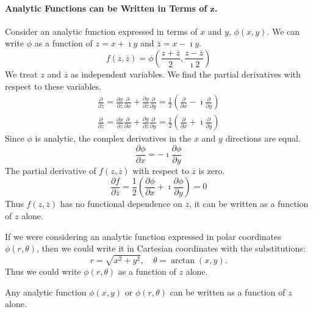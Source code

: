 \paragraph{Analytic Functions can be Written in Terms of $\mathbf{z}$.}
Consider an analytic function expressed in terms of $x$ and $y$, $\phi(x, y)$.
We can write $\phi$ as a function of $z = x + \imath y$ and $\overline{z} = x - \imath y$.
\[
f \left( z, \overline{z} \right) 
= \phi \left( \frac{z + \overline{z}}{2}, \frac{z - \overline{z}}{\imath 2} \right)
\]
We treat $z$ and $\overline{z}$ as independent variables.  We find the 
partial derivatives with respect to these variables.
\begin{gather*}
  \frac{\partial}{\partial z} = \frac{\partial x}{\partial z} \frac{\partial}{\partial x} 
  + \frac{\partial y}{\partial z} \frac{\partial }{\partial y}
  = \frac{1}{2} \left( \frac{\partial}{\partial x} - \imath \frac{\partial}{\partial y} \right) 
  \\
  \frac{\partial}{\partial \overline{z}} 
  = \frac{\partial x}{\partial \overline{z}} \frac{\partial}{\partial x} 
  + \frac{\partial y}{\partial \overline{z}} \frac{\partial}{\partial y}
  = \frac{1}{2} \left( \frac{\partial}{\partial x} + \imath \frac{\partial}{\partial y} \right)
\end{gather*}
Since $\phi$ is analytic, the complex derivatives in the $x$ and $y$ directions
are equal.
\[
\frac{\partial \phi}{\partial x} = - \imath \frac{\partial \phi}{\partial y}
\]
The partial derivative of $f\left( z,\overline{z} \right)$ 
with respect to $\overline{z}$ is zero.
\[
\frac{\partial f}{\partial \overline{z}} 
= \frac{1}{2} \left( \frac{\partial \phi}{\partial x} + \imath \frac{\partial \phi}{\partial y} \right)
= 0
\]
Thus $f\left( z,\overline{z} \right)$ has no functional dependence 
on $\overline{z}$, it can be written as a function of $z$ alone.

If we were considering an analytic function expressed in polar coordinates
$\phi(r, \theta)$, then we could write it in Cartesian coordinates with the 
substitutions: 
\[
r = \sqrt{x^2 + y^2}, \quad \theta = \arctan(x, y).
\]
Thus we could write $\phi(r, \theta)$ as a function of $z$ alone.




\begin{Result}
  Any analytic function $\phi(x, y)$ or $\phi(r,\theta)$ can be written as a function 
  of $z$ alone.
\end{Result}












